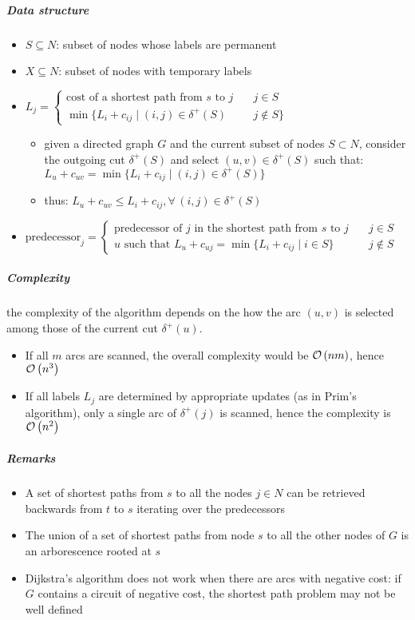 \documentclass[english]{article}
\begin{document}
\subparagraph*{Data structure}
\begin{itemize}
  \item \(S \subseteq N\): subset of nodes whose labels are permanent
  \item \(X \subseteq N\): subset of nodes with temporary labels
  \item \(L_j = \begin{cases} \text{cost of a shortest path from } s \text{ to } j \quad & j \in S \\ \min\{L_i + c_{ij} \mid   (i, j) \in \delta^+(S) & j \notin S\}\end{cases}\)
        \begin{itemize}[label=\(\rightarrow\)]
          \item given a directed graph \(G\) and the current subset of nodes \(S \subset N\), consider the outgoing cut \(\delta^+(S)\) and select \((u, v) \in \delta^+(S)\) such that: \( L_u + c_{uv} = \min\{L_i + c_{ij} \mid   (i, j) \in \delta^+ (S)\}\)
          \item thus: \(L_u + c_{uv} \leq L_i + c_{ij}, \forall \, (i, j) \in \delta^+(S)\)
        \end{itemize}
  \item \(\text{predecessor}_j = \begin{cases}\text{predecessor of } j \text{ in the shortest path from } s \text{ to } j \quad& j \in S \\ u \text{ such that } L_u + c_{uj} = \min\{L_i + c_{ij} \mid   i \in S\} & j \notin S\end{cases}\)
\end{itemize}

\subparagraph*{Complexity}
the complexity of the algorithm depends on the how the arc \((u, v)\) is selected among those of the current cut \(\delta^+(u)\).
\begin{itemize}
  \item If all \(m\) arcs are scanned, the overall complexity would be \(\mathcal{O}\left(nm\right)\), hence \(\mathcal{O}\left(n^3\right)\)
  \item If all labels \(L_j\) are determined by appropriate updates (as in Prim's algorithm), only a single arc of \(\delta^+(j)\) is scanned, hence the complexity is \(\mathcal{O}\left(n^2\right)\)
\end{itemize}

\subparagraph*{Remarks}
\begin{itemize}
  \item A set of shortest paths from \(s\) to all the nodes \(j \in N\) can be retrieved backwards from \(t\) to \(s\) iterating over the predecessors
  \item The union of a set of shortest paths from node \(s\) to all the other nodes of \(G\) is an arborescence rooted at \(s\)
  \item Dijkstra's algorithm does not work when there are arcs with negative cost: if \(G\) contains a circuit of negative cost, the shortest path problem may not be well defined
\end{itemize}
\end{document}
